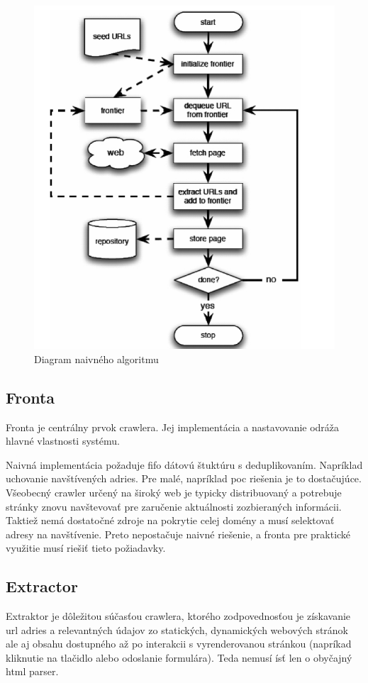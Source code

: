 \begin{figure}[!ht]
    \centering
    \includegraphics[width=.9\textwidth]{figures/basicCrawlAlgorithm.png}
    \caption{Diagram naivného algoritmu \label{o:basic_crawl_algorithm} \cite{dataMining}}
\end{figure}

\subsection{Fronta}
Fronta je centrálny prvok crawlera. Jej implementácia a nastavovanie odráža hlavné vlastnosti systému. 

Naivná implementácia požaduje \acrshort{fifo} dátovú štuktúru s deduplikovaním. Napríklad uchovanie navštívených adries. Pre malé, napríklad \acrshort{poc} riešenia je to dostačujúce. 
Všeobecný crawler určený na široký web je typicky distribuovaný a potrebuje stránky znovu navštevovať pre zaručenie aktuálnosti zozbieraných informácii. Taktiež nemá dostatočné zdroje na pokrytie celej domény a musí selektovať adresy na navštívenie. Preto nepostačuje naivné riešenie, a fronta pre praktické využitie musí riešiť tieto požiadavky. 

\subsection{Extractor}
Extraktor je dôležitou súčasťou crawlera, ktorého zodpovednosťou je získavanie \acrshort{url} adries a relevantných údajov zo statických, dynamických webových stránok ale aj obsahu dostupného až po interakcii s vyrenderovanou stránkou (napríkad kliknutie na tlačidlo alebo odoslanie formulára). Teda nemusí ísť len o obyčajný \acrshort{html} parser. 

